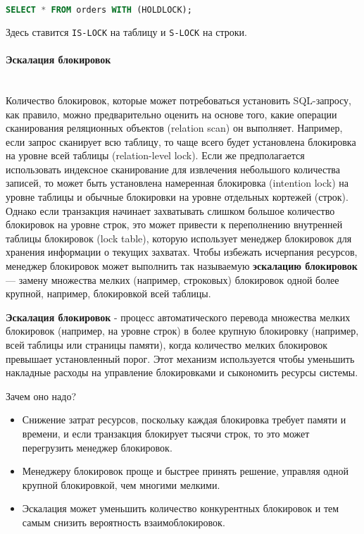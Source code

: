  \begin{lstlisting}[language=SQL]
     SELECT * FROM orders WITH (HOLDLOCK);
 \end{lstlisting}
 
 Здесь ставится \texttt{IS-LOCK} на таблицу и \texttt{S-LOCK} на строки.

\paragraph{Эскалация блокировок} ~\\

Количество блокировок, которые может потребоваться установить SQL-запросу, как правило, можно предварительно оценить на основе того, какие операции сканирования реляционных объектов (relation scan) он выполняет. Например, если запрос сканирует всю таблицу, то чаще всего будет установлена блокировка на уровне всей таблицы (relation-level lock). Если же предполагается использовать индексное сканирование для извлечения небольшого количества записей, то может быть установлена намеренная блокировка (intention lock) на уровне таблицы и обычные блокировки на уровне отдельных кортежей (строк). Однако если транзакция начинает захватывать слишком большое количество блокировок на уровне строк, это может привести к переполнению внутренней таблицы блокировок (lock table), которую использует менеджер блокировок для хранения информации о текущих захватах. Чтобы избежать исчерпания ресурсов, менеджер блокировок может выполнить так называемую \textbf{эскалацию блокировок} — замену множества мелких (например, строковых) блокировок одной более крупной, например, блокировкой всей таблицы. \autocites[ch.18]{Silberschatz}

\begin{grayquote}
    \textbf{Эскалация блокировок} - процесс автоматического перевода множества мелких блокировок (например, на уровне строк) в более крупную блокировку (например, всей таблицы или страницы памяти), когда количество мелких блокировок превышает установленный порог. Этот механизм используется чтобы уменьшить накладные расходы на управление блокировками и сыкономить ресурсы системы.
\end{grayquote}

Зачем оно надо?
\begin{itemize}
    \item Снижение затрат ресурсов, поскольку каждая блокировка требует памяти и времени, и если транзакция блокирует тысячи строк, то это может перегрузить менеджер блокировок.
    \item Менеджеру блокировок проще и быстрее принять решение, управляя одной крупной блокировкой, чем многими мелкими.
    \item Эскалация может уменьшить количество конкурентных блокировок и тем самым снизить вероятность взаимоблокировок.
\end{itemize}

